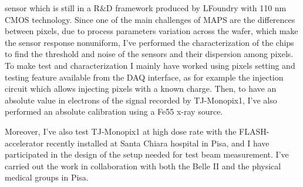 \documentclass[a4paper]{report}
\begin{document}
 
 sensor which is still in a R$\&$D framework produced by LFoundry with 110 nm CMOS technology. 
Since one of the main challenges of MAPS are the differences between pixels, due to process parameters variation across the wafer, which make the sensor response nonuniform, I've performed the characterization of the chips to find the threshold and noise of the sensors and their dispersion among pixels. To make test and characterization I mainly have worked using pixels setting and testing feature available from the DAQ interface, as for example the injection circuit which allows injecting pixels with a known charge. Then, to have an absolute value in electrons of the signal recorded by TJ-Monopix1, I've also performed an absolute calibration using a Fe55 x-ray source. 

Moreover, I've also test TJ-Monopix1 at high dose rate with the FLASH-accelerator recently installed at Santa Chiara hospital in Pisa, and I have participated in the design of the setup needed for test beam measurement.
I've carried out the work in collaboration with both the Belle II and the physical medical groups in Pisa.
\end{document}
